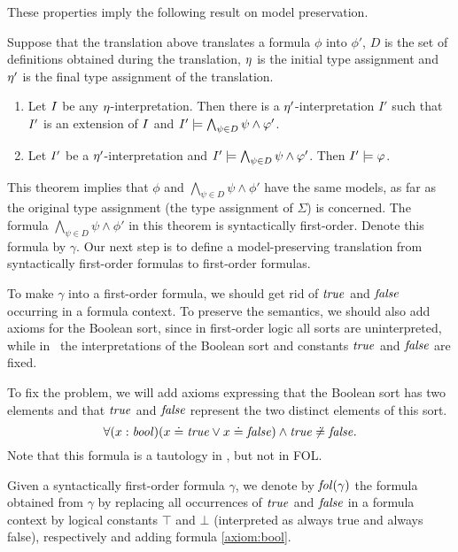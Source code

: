 These properties imply the following result on model preservation.

\begin{theorem}\label{thm:model:preservation}\rm
  Suppose that the translation above translates a formula $\phi$ into $\phi'$, $D$ is the set of definitions obtained during the translation, $\eta$ is the initial type assignment and $\eta'$ is the final type assignment of the translation. 
  \begin{enumerate}
    \item Let $I$ be any $\eta$-interpretation. Then there is a $\eta'$-interpretation $I'$ such that $I'$ is an extension of $I$ and $I' \models \bigwedge_{\psi \in D} \psi \wedge \varphi'$.
    \item Let $I'$ be a $\eta'$-interpretation and $I' \models \bigwedge_{\psi \in D} \psi \wedge \varphi'$. Then $I' \models \varphi$. \QED
  \end{enumerate}
\end{theorem}
This theorem implies that $\phi$ and $\bigwedge_{\psi \in D} \psi \wedge \phi'$ have the same models, as far as the original type assignment (the type assignment of $\Sigma$) is concerned. The formula $\bigwedge_{\psi \in D} \psi \wedge \phi'$ in this theorem is syntactically first-order. Denote this formula by $\gamma$. Our next step is to define a model-preserving translation from syntactically first-order formulas to first-order formulas.

To make $\gamma$ into a first-order formula, we should get rid of $\mathit{true}$ and $\mathit{false}$ occurring in a formula context. To preserve the semantics, we should also add axioms for the Boolean sort, since in first-order logic all sorts are uninterpreted, while in \folb\ the interpretations of the Boolean sort and constants $\mathit{true}$ and $\mathit{false}$ are fixed. 

To fix the problem, we will add axioms expressing that the Boolean sort has two elements and that $\mathit{true}$ and $\mathit{false}$ represent the two distinct elements of this sort.
\begin{equation}\label{axiom:bool}
  \forall (x:\mathit{bool})(x \doteq \mathit{true} \vee x \doteq \mathit{false}) \wedge \mathit{true} \not\doteq \mathit{false}.
\end{equation}
Note that this formula is a tautology in \folb, but not in FOL.

Given a syntactically first-order formula $\gamma$, we denote by $\mathit{fol}(\gamma)$ the formula obtained from $\gamma$ by replacing all occurrences of $\mathit{true}$ and $\mathit{false}$ in a formula context by logical constants $\top$ and $\bot$ (interpreted as always true and always false), respectively and adding formula \eqref{axiom:bool}.

